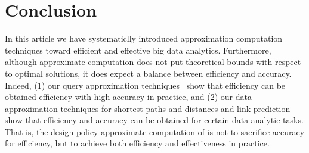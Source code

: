 \section{Conclusion}
\label{sec-conclusion}

In this article we have systematiclly introduced approximation computation techniques toward efficient and effective big data analytics.
Furthermore, although approximate computation does not put
theoretical bounds with respect to optimal solutions, it does expect a balance between efficiency and accuracy. Indeed, (1) our query approximation techniques~\cite{tods-MaCFHW14,LinMZWH17,MaHWLH17} show that efficiency can be obtained efficiency with high accuracy in practice, and (2) our data approximation techniques for shortest paths and distances and link prediction~\cite{MaFLWCH16,DuanMAMH17} show that efficiency and accuracy can be obtained for certain data analytic tasks. That is, the design policy approximate computation of is not to sacrifice accuracy for efficiency, but to achieve both efficiency and effectiveness in practice.

